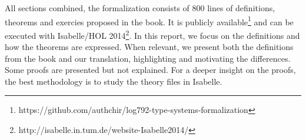 All sections combined, the formalization consists of 800 lines of definitions, theorems and exercies
proposed in the book. It is publicly available\footnote{
https://github.com/authchir/log792-type-systems-formalization} and can be executed with Isabelle/HOL
2014\footnote{http://isabelle.in.tum.de/website-Isabelle2014/}. In this report, we focus on the
definitions and how the theorems are expressed. When relevant, we present both the definitions from
the book and our translation, highlighting and motivating the differences. Some proofs are presented
but not explained. For a deeper insight on the proofs, the best methodology is to study the theory
files in Isabelle.


